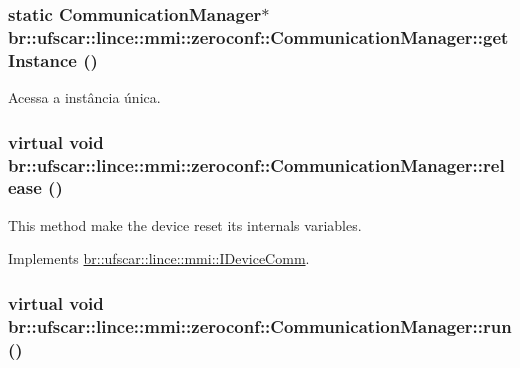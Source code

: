 \hypertarget{classbr_1_1ufscar_1_1lince_1_1mmi_1_1zeroconf_1_1CommunicationManager_ae9d111bd7e4f269a80deee7bbe9c9fcd}{
\subsubsection[{getInstance}]{\setlength{\rightskip}{0pt plus 5cm}static {\bf CommunicationManager}$\ast$ br::ufscar::lince::mmi::zeroconf::CommunicationManager::getInstance ()}}
\label{classbr_1_1ufscar_1_1lince_1_1mmi_1_1zeroconf_1_1CommunicationManager_ae9d111bd7e4f269a80deee7bbe9c9fcd}


Acessa a instância única. 

\hypertarget{classbr_1_1ufscar_1_1lince_1_1mmi_1_1zeroconf_1_1CommunicationManager_aef7bfab9cd63ab8e75fb0782e019574b}{
\subsubsection[{release}]{\setlength{\rightskip}{0pt plus 5cm}virtual void br::ufscar::lince::mmi::zeroconf::CommunicationManager::release ()}}
\label{classbr_1_1ufscar_1_1lince_1_1mmi_1_1zeroconf_1_1CommunicationManager_aef7bfab9cd63ab8e75fb0782e019574b}


This method make the device reset its internals variables. 



Implements \hyperlink{classbr_1_1ufscar_1_1lince_1_1mmi_1_1IDeviceComm_a9c173ebb83a502e78143a52fc7d87a80}{br::ufscar::lince::mmi::IDeviceComm}.

\hypertarget{classbr_1_1ufscar_1_1lince_1_1mmi_1_1zeroconf_1_1CommunicationManager_a3f1607eb5807f50ee40882543220d0fb}{
\subsubsection[{run}]{\setlength{\rightskip}{0pt plus 5cm}virtual void br::ufscar::lince::mmi::zeroconf::CommunicationManager::run ()}}
\label{classbr_1_1ufscar_1_1lince_1_1mmi_1_1zeroconf_1_1CommunicationManager_a3f1607eb5807f50ee40882543220d0fb}


